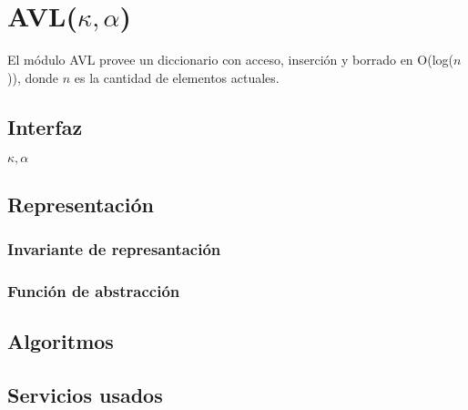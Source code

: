 \section{AVL($\kappa, \alpha$)}

El módulo AVL provee un diccionario con acceso, inserción y borrado en O(log($n$)), donde $n$ es la cantidad de elementos actuales.

\subsection{Interfaz}

\begin{iparamformales}{$\kappa, \alpha$}

\end{iparamformales}

\iusa{}

\subsection{Representación}

\subsubsection{Invariante de represantación}

\subsubsection{Función de abstracción}

\subsection{Algoritmos}

\subsection{Servicios usados}


